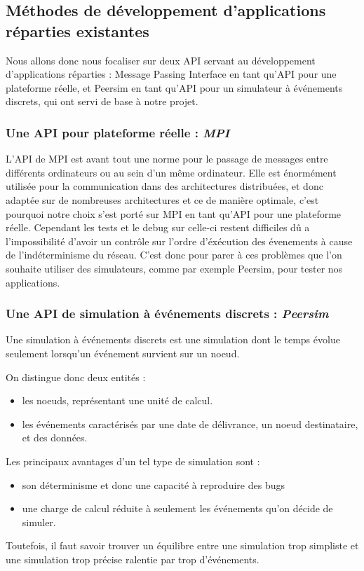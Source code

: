 \documentclass{article}
\begin{document}
			\subsection{Méthodes de développement d'applications réparties existantes}

				Nous allons donc nous focaliser sur deux API servant au développement d'applications réparties : Message Passing Interface en tant qu'API pour une plateforme réelle, et Peersim en tant qu'API pour un simulateur à événements discrets, qui ont servi de base à notre projet.

				\subsubsection{Une API pour plateforme réelle : \textit{MPI}}
					L'API de MPI est avant tout une norme pour le passage de messages entre différents ordinateurs ou au sein d'un même ordinateur.
					Elle est énormément utilisée pour la communication dans des architectures distribuées, et donc adaptée sur de nombreuses architectures et ce de manière optimale, c'est pourquoi notre choix s'est porté sur MPI en tant qu'API pour une plateforme réelle.
					Cependant les tests et le debug sur celle-ci restent difficiles dû a l'impossibilité d'avoir un contrôle sur l'ordre d'éxécution des évenements à cause de l'indéterminisme du réseau. C'est donc pour parer à ces problèmes que l'on souhaite utiliser des simulateurs, comme par exemple Peersim, pour tester nos applications.
				
				
				\subsubsection{Une API de simulation à événements discrets : \textit{Peersim}}
					Une simulation à événements discrets est une simulation dont le temps évolue seulement lorsqu'un événement survient sur un noeud.

					On distingue donc deux entités :
\begin{itemize}
\item les noeuds, représentant une unité de calcul.
\item les événements caractérisés par une date de délivrance, un noeud destinataire, et des données.
\end{itemize}

					Les principaux avantages d'un tel type de simulation sont :
\begin{itemize}
\item son déterminisme et donc une capacité à reproduire des bugs
\item une charge de calcul réduite à seulement les événements qu'on décide de simuler. 
\end{itemize}
Toutefois, il faut savoir trouver un équilibre entre une simulation trop simpliste et une simulation trop précise ralentie par trop d'événements.
\end{document}
